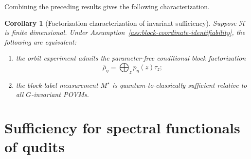\documentclass{article}
\newtheorem{corollary}[theorem]{Corollary}
\theoremstyle{named}
\theoremstyle{named1}
\newcommand{\Tr}{\operatorname{Tr}}
\newcommand{\cA}{\mathcal A}
\theoremstyle{plain}
\theoremstyle{remark}
\begin{document}



Combining the preceding results gives the following characterization.

\begin{corollary}[Factorization characterization of invariant sufficiency]
\label{cor:factorization-characterization}
Suppose $\mathcal{H}$ is finite dimensional. Under Assumption~\ref{ass:block-coordinate-identifiability}, the following are
equivalent:
\begin{enumerate}[label=\textup{(\roman*)}]
\item the orbit experiment admits the parameter-free conditional block
factorization
\[
    \bar\rho_\eta
    =
    \bigoplus_zp_\eta(z)\tau_z;
\]
\item the block-label measurement $M^\star$ is quantum-to-classically
sufficient relative to all $G$-invariant POVMs.
\end{enumerate}
\end{corollary}



\section{Sufficiency for spectral functionals of qudits}
\label{sec:wss}
\end{document}
